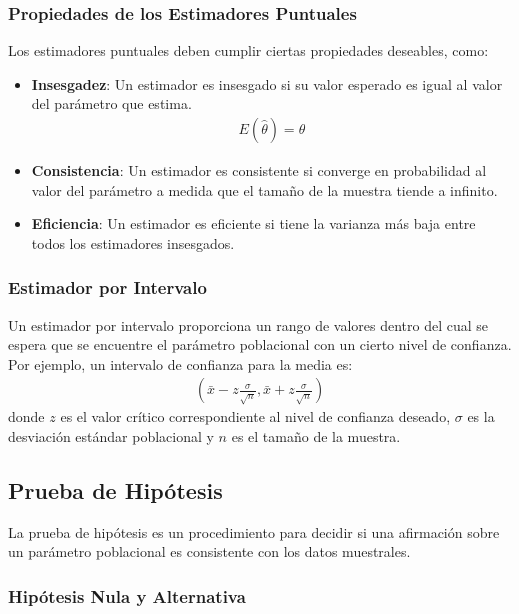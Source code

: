 \documentclass[a4paper]{report} %
\begin{document}
\subsubsection{Propiedades de los Estimadores Puntuales}

Los estimadores puntuales deben cumplir ciertas propiedades deseables, como:

\begin{itemize}
    \item \textbf{Insesgadez}: Un estimador es insesgado si su valor esperado es igual al valor del par\'ametro que estima.
    \begin{eqnarray*}
    E(\hat{\theta}) = \theta
    \end{eqnarray*}
    \item \textbf{Consistencia}: Un estimador es consistente si converge en probabilidad al valor del par\'ametro a medida que el tama\~no de la muestra tiende a infinito.
    \item \textbf{Eficiencia}: Un estimador es eficiente si tiene la varianza m\'as baja entre todos los estimadores insesgados.
\end{itemize}

\subsubsection{Estimador por Intervalo}

Un estimador por intervalo proporciona un rango de valores dentro del cual se espera que se encuentre el par\'ametro poblacional con un cierto nivel de confianza. Por ejemplo, un intervalo de confianza para la media es:
\begin{eqnarray*}
\left( \bar{x} - z \frac{\sigma}{\sqrt{n}}, \bar{x} + z \frac{\sigma}{\sqrt{n}} \right)
\end{eqnarray*}
donde $z$ es el valor cr\'itico correspondiente al nivel de confianza deseado, $\sigma$ es la desviaci\'on est\'andar poblacional y $n$ es el tama\~no de la muestra.

\subsection{Prueba de Hip\'otesis}

La prueba de hip\'otesis es un procedimiento para decidir si una afirmaci\'on sobre un par\'ametro poblacional es consistente con los datos muestrales.

\subsubsection{Hip\'otesis Nula y Alternativa}
\end{document}
